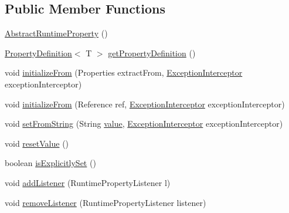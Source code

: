 \subsection*{Public Member Functions}
\begin{DoxyCompactItemize}
\item 
\mbox{\hyperlink{classcom_1_1mysql_1_1cj_1_1conf_1_1_abstract_runtime_property_a7f22d3e4a9a8d8a6bc6281269afbe06b}{Abstract\+Runtime\+Property}} ()
\item 
\mbox{\hyperlink{interfacecom_1_1mysql_1_1cj_1_1conf_1_1_property_definition}{Property\+Definition}}$<$ T $>$ \mbox{\hyperlink{classcom_1_1mysql_1_1cj_1_1conf_1_1_abstract_runtime_property_a7b2a2a91db076eac215a0dad7e658515}{get\+Property\+Definition}} ()
\item 
void \mbox{\hyperlink{classcom_1_1mysql_1_1cj_1_1conf_1_1_abstract_runtime_property_aa821d8b742dfb3c658972f11f57ad02c}{initialize\+From}} (Properties extract\+From, \mbox{\hyperlink{interfacecom_1_1mysql_1_1cj_1_1exceptions_1_1_exception_interceptor}{Exception\+Interceptor}} exception\+Interceptor)
\item 
void \mbox{\hyperlink{classcom_1_1mysql_1_1cj_1_1conf_1_1_abstract_runtime_property_ad1d2dcce52a6e6284cebb20fbf9729db}{initialize\+From}} (Reference ref, \mbox{\hyperlink{interfacecom_1_1mysql_1_1cj_1_1exceptions_1_1_exception_interceptor}{Exception\+Interceptor}} exception\+Interceptor)
\item 
void \mbox{\hyperlink{classcom_1_1mysql_1_1cj_1_1conf_1_1_abstract_runtime_property_a06e57f3969b0cacb8b4e58888c79c18f}{set\+From\+String}} (String \mbox{\hyperlink{classcom_1_1mysql_1_1cj_1_1conf_1_1_abstract_runtime_property_ac83f2926daba2525ee721f21254c8d6f}{value}}, \mbox{\hyperlink{interfacecom_1_1mysql_1_1cj_1_1exceptions_1_1_exception_interceptor}{Exception\+Interceptor}} exception\+Interceptor)
\item 
void \mbox{\hyperlink{classcom_1_1mysql_1_1cj_1_1conf_1_1_abstract_runtime_property_af8d93196b5571652a430ae751df642f9}{reset\+Value}} ()
\item 
boolean \mbox{\hyperlink{classcom_1_1mysql_1_1cj_1_1conf_1_1_abstract_runtime_property_addb0599475473228acd97cfd1087d693}{is\+Explicitly\+Set}} ()
\item 
void \mbox{\hyperlink{classcom_1_1mysql_1_1cj_1_1conf_1_1_abstract_runtime_property_ac64a41d2f3d03d32b3252b0747cdf030}{add\+Listener}} (Runtime\+Property\+Listener l)
\item 
void \mbox{\hyperlink{classcom_1_1mysql_1_1cj_1_1conf_1_1_abstract_runtime_property_a2c639b0ccaeee9e568efefe136a0c073}{remove\+Listener}} (Runtime\+Property\+Listener listener)
\end{DoxyCompactItemize}
